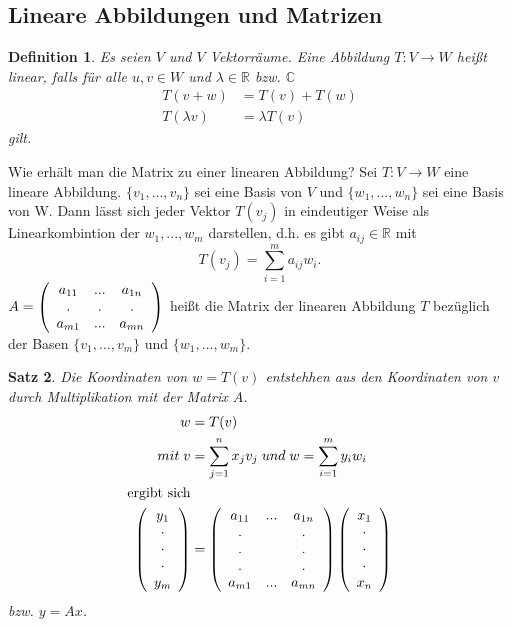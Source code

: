 \documentclass[12pt,a4paper]{article}%
\newtheorem{satz}{Satz}[section]
\newtheorem{definition}[satz]{Definition}
\numberwithin{equation}{section}
\newcommand{\R}{\mathbb{R}} %
\newcommand{\C}{\mathbb{C}}
\def\ccite#1#2{\glqq #1\grqq\cite{#2}}
\def\vecT#1{\left(\begin{array}{c} #1 \end{array}\right)}
\def\dddot{\cdot \\ \cdot \\ \cdot}
\def\vecDt#1#2{\vecT{#1 \\ \dddot \\ #2}}
\numberwithin{equation}{subsection}
\begin{document}
  \subsection{Lineare Abbildungen und Matrizen}
  \begin{definition}
    \ccite{Es seien $V$ und $V$ Vektorräume. Eine Abbildung $T: V\rightarrow W$ heißt linear, falls für alle $u,v \in W$ und $\lambda \in \R$ bzw. $\C$
    \begin{align}
      T(v+w) &= T(v) + T(w)\\
      T(\lambda v) &= \lambda T(v)
    \end{align}
    gilt.}{HM12}
  \end{definition}
  
  Wie erhält man die Matrix zu einer linearen Abbildung?\newline
  \ccite{
    Sei $T:V \rightarrow W$ eine lineare Abbildung. $\lbrace v_1,...,v_n\rbrace$ sei eine Basis von $V$ und $\lbrace w_1,...,w_n\rbrace$ sei eine Basis von W. Dann lässt sich jeder Vektor $T(v_j)$ in eindeutiger Weise als Linearkombintion der $w_1,...,w_m$ darstellen, d.h. es gibt $a_{ij} \in \R$ mit 
    \begin{equation}
      T(v_j) = \sum_{i = 1}^m a_{ij} w_i\text{.}
    \end{equation}
    $
      A = \left( 
      \begin{array}{c c c}
        a_{11} & ... & a_{1n}\\
        .      & .   &.      \\
        a_{m1} & ... & a_{mn}\\
      \end{array}
      \right)
    $
    heißt die Matrix der linearen Abbildung $T$ bezüglich der Basen $\lbrace v_1,...,v_m\rbrace$ und $\lbrace w_1,...,w_m\rbrace$.
  }{HM12}
  
  \begin{satz}
  \ccite{
    Die Koordinaten von $w = T(v)$ entstehhen aus den Koordinaten von $v$ durch Multiplikation mit der Matrix $A$.  
    \begin{align}
      w &= T(v) \nonumber\\ 
      mit \; v &= \sum_{j = 1}^n x_j v_j \; und \; w = \sum_{i = 1}^m y_i w_i \nonumber\\
      \text{ergibt sich} \nonumber\\
      \vecDt{y_1}{y_m} &= 
      \left(\begin{array}{c c c}
        a_{11} & ... & a_{1n} \\
        .      & \;  & .      \\
        .      & \;  & .      \\
        .      & \;  & .      \\
        a_{m1} & ... & a_{mn} \\
      \end{array}\right) 
      \vecDt{x_1}{x_n}
    \end{align}
    bzw. $y = Ax$.
  }{HM12}
  \end{satz}
  
\end{document}
